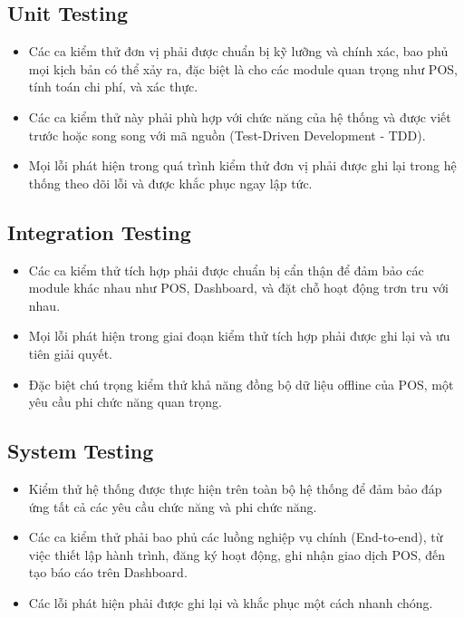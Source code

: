 \documentclass[a4paper,12pt]{article}
\begin{document}
	\subsection{Unit Testing}
	
	\begin{itemize}
		\item Các ca kiểm thử đơn vị phải được chuẩn bị kỹ lưỡng và chính xác, bao phủ mọi kịch bản có thể xảy ra, đặc biệt là cho các module quan trọng như POS, tính toán chi phí, và xác thực.
		\item Các ca kiểm thử này phải phù hợp với chức năng của hệ thống và được viết trước hoặc song song với mã nguồn (Test-Driven Development - TDD).
		\item Mọi lỗi phát hiện trong quá trình kiểm thử đơn vị phải được ghi lại trong hệ thống theo dõi lỗi và được khắc phục ngay lập tức.
	\end{itemize}
	
	\subsection{Integration Testing}
	
	\begin{itemize}
		\item Các ca kiểm thử tích hợp phải được chuẩn bị cẩn thận để đảm bảo các module khác nhau như POS, Dashboard, và đặt chỗ hoạt động trơn tru với nhau.
		\item Mọi lỗi phát hiện trong giai đoạn kiểm thử tích hợp phải được ghi lại và ưu tiên giải quyết.
		\item Đặc biệt chú trọng kiểm thử khả năng đồng bộ dữ liệu offline của POS, một yêu cầu phi chức năng quan trọng.
	\end{itemize}
	
	\subsection{System Testing}
	
	\begin{itemize}
		\item Kiểm thử hệ thống được thực hiện trên toàn bộ hệ thống để đảm bảo đáp ứng tất cả các yêu cầu chức năng và phi chức năng.
		\item Các ca kiểm thử phải bao phủ các luồng nghiệp vụ chính (End-to-end), từ việc thiết lập hành trình, đăng ký hoạt động, ghi nhận giao dịch POS, đến tạo báo cáo trên Dashboard.
		\item Các lỗi phát hiện phải được ghi lại và khắc phục một cách nhanh chóng.
	\end{itemize}
	
\end{document}
